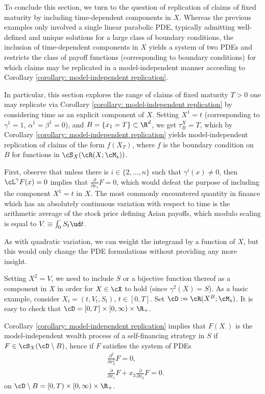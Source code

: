 \documentclass[11pt]{article}
\begin{document}
To conclude this section, we turn to the question of replication of claims of fixed maturity by including time-dependent components in $X$. Whereas the previous examples only involved a single linear parabolic PDE, typically admitting well-defined and unique solutions for a large class of boundary conditions, the inclusion of time-dependent components in $X$ yields a system of two PDEs and restricts the class of payoff functions (corresponding to boundary conditions) for which claims may be replicated in a model-independent manner according to Corollary \ref{corollary: model-independent replication}.

In particular, this section explores the range of claims of fixed maturity $T > 0$ one may replicate via Corollary \ref{corollary: model-independent replication} by considering time as an explicit component of $X$. Setting $X^1 = t$ (corresponding to $\gamma^{1} = 1$, $\alpha^{1} = \beta^{1} = 0$), and $B = \{x_1 = T\} \subset \R^{d}$, we get $\tau^X_B = T$, which by Corollary \ref{corollary: model-independent replication} yields model-independent replication of claims of the form $f(X_T)$, where $f$ is the boundary condition on $B$ for functions in $\cS_X(\cR(X;\cM_s))$.

First, observe that unless there is $i \in \{2,\ldots,n\}$ such that $\gamma^{i}(x) \neq 0$, then $\cL^\gamma F(x) = 0$ implies that $\frac{\partial}{\partial x_1}F = 0$, which would defeat the purpose of including the component $X^1 = t$ in $X$. The most commonly encountered quantity in finance which has an absolutely continuous variation with respect to time is the arithmetic average of the stock price defining Asian payoffs, which modulo scaling is equal to $
V_\cdot \equiv \int_0^\cdot S_t \ud t$.

\begin{remark}
\label{remark: weighted Asian}
As with quadratic variation, we can weight the integrand by a function of $X$, but this would only change the PDE formulations without providing any more insight.
\end{remark}

Setting $X^2 = V$, we need to include $S$ or a bijective function thereof as a component in $X$ in order for $X \in\cX$ to hold (since $\gamma^{2}(X) = S$). As a basic example, consider $X_t = (t, V_t, S_t)$, $t \in [0,T]$. Set $\cD := \cR(X^B; \cM_s)$. It is easy to check that $\cD = [0,T] \times [0,\infty) \times \R_+$.

Corollary \ref{corollary: model-independent replication} implies that $F(X_\cdot)$ is the model-independent wealth process of a self-financing strategy in $S$ if $F \in \cS_X(\cD \setminus B)$, hence if $F$ satisfies the system of PDEs
\begin{align}
&\frac{\partial^2}{\partial x_3^2} F = 0 \label{PDE for F(t,V,S) due to [S]}, \\
&\frac{\partial}{\partial x_1}F + x_3 \frac{\partial}{\partial x_2}F = 0. \label{PDE for F(t,V,S) due to t}
\end{align}
on $\cD \setminus B = [0,T) \times [0,\infty) \times \R_+$.
\end{document}
